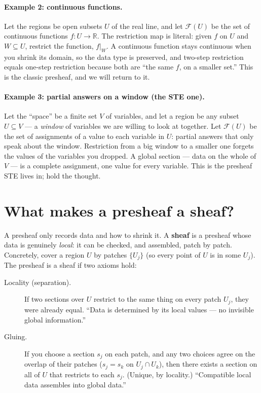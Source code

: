 \documentclass[11pt]{article}
\begin{document}
\paragraph{Example 2: continuous functions.}
Let the regions be open subsets $U$ of the real line, and let
$\mathcal{F}(U)$ be the set of continuous functions
$f\colon U \to \mathbb{R}$.  The restriction map is literal: given $f$
on $U$ and $W \subseteq U$, restrict the function, $f|_W$.  A
continuous function stays continuous when you shrink its domain, so the
data type is preserved, and two-step restriction equals one-step
restriction because both are ``the same $f$, on a smaller set.''  This
is the classic presheaf, and we will return to it.

\paragraph{Example 3: partial answers on a window (the STE one).}
Let the ``space'' be a finite set $V$ of variables, and let a region be
any subset $U \subseteq V$ --- a \emph{window} of variables we are
willing to look at together.  Let $\mathcal{F}(U)$ be the set of
assignments of a value to each variable in $U$: partial answers that
only speak about the window.  Restriction from a big window to a
smaller one forgets the values of the variables you dropped.  A global
section --- data on the whole of $V$ --- is a complete assignment, one
value for every variable.  This is the presheaf STE lives in; hold the
thought.

\section{What makes a presheaf a sheaf?}
A presheaf only records data and how to shrink it.  A \textbf{sheaf} is
a presheaf whose data is genuinely \emph{local}: it can be checked, and
assembled, patch by patch.  Concretely, cover a region $U$ by patches
$\{U_j\}$ (so every point of $U$ is in some $U_j$).  The presheaf is a
sheaf if two axioms hold:

\begin{description}
\item[Locality (separation).]  If two sections over $U$ restrict to the
  same thing on every patch $U_j$, they were already equal.  ``Data is
  determined by its local values --- no invisible global information.''
\item[Gluing.]  If you choose a section $s_j$ on each patch, and any
  two choices agree on the overlap of their patches
  ($s_j = s_k$ on $U_j \cap U_k$), then there exists a section on all
  of $U$ that restricts to each $s_j$.  (Unique, by locality.)
  ``Compatible local data assembles into global data.''
\end{description}
\end{document}
